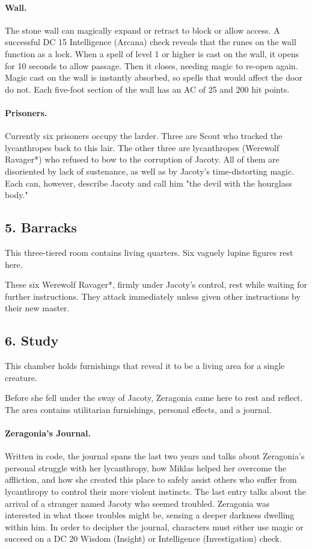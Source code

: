 \documentclass[10pt,a4paper,twoside,twocolumn,openany,bg=print,nodeprecatedcode]{dndbook}
\begin{document}
\paragraph{Wall.}
The stone wall can magically expand or retract to block or allow access. A successful DC 15 Intelligence (Arcana) check reveals that the runes on the wall function as a lock. When a spell of level 1 or higher is cast on the wall, it opens for 10 seconds to allow passage. Then it closes, needing magic to re-open again. Magic cast on the wall is instantly absorbed, so spells that would affect the door do not. Each five-foot section of the wall has an AC of 25 and 200 hit points.
\paragraph{Prisoners.}
Currently six prisoners occupy the larder. Three are Scout who tracked the lycanthropes back to this lair. The other three are lycanthropes (Werewolf Ravager*) who refused to bow to the corruption of Jacoty. All of them are disoriented by lack of sustenance, as well as by Jacoty's time-distorting magic. Each can, however, describe Jacoty and call him "the devil with the hourglass body."
\subsection{5. Barracks}
\begin{DndReadAloud}{}
This three-tiered room contains living quarters.
Six vaguely lupine figures rest here.
\end{DndReadAloud}

These six Werewolf Ravager*, firmly under Jacoty's control, rest while waiting for further instructions. They attack immediately unless given other instructions by their new master.
\subsection{6. Study}
\begin{DndReadAloud}{}
This chamber holds furnishings that reveal it to be a living area for a single creature.
\end{DndReadAloud}

Before she fell under the sway of Jacoty, Zeragonia came here to rest and reflect. The area contains utilitarian furnishings, personal effects, and a journal.
\paragraph{Zeragonia's Journal.}
Written in code, the journal spans the last two years and talks about Zeragonia's personal struggle with her lycanthropy, how Miklas helped her overcome the affliction, and how she created this place to safely assist others who suffer from lycanthropy to control their more violent instincts. The last entry talks about the arrival of a stranger named Jacoty who seemed troubled. Zeragonia was interested in what those troubles might be, sensing a deeper darkness dwelling within him.
In order to decipher the journal, characters must either use magic or succeed on a DC 20 Wisdom (Insight) or Intelligence (Investigation) check.
\end{document}
